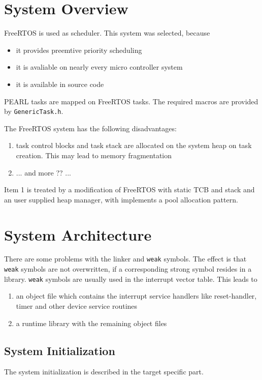 \section{System Overview}
FreeRTOS is used as scheduler. This system was selected, because
\begin{itemize}
\item it provides preemtive priority scheduling
\item it is avaliable on nearly every micro controller system
\item it is available in source code
\end{itemize}

PEARL tasks are mapped on FreeRTOS tasks. The required macros
are provided by \texttt{GenericTask.h}.

The FreeRTOS system has the following disadvantages:
\begin{enumerate}
\item task control blocks and task stack are allocated on the system
   heap on task creation. This may lead to memory fragmentation
\item ... and more ?? ... 
\end{enumerate}

Item 1 is treated by a modification of FreeRTOS with static TCB and stack
and an user supplied heap manager, with implements a pool allocation pattern.

\section{System Architecture}
There are some problems with the linker and \texttt{weak} symbols.
The effect is that \texttt{weak} symbols are not overwritten, if
a corresponding strong symbol resides in a library.
\texttt{weak} symbols are usually used in the interrupt vector table.
This leads to
\begin{enumerate}
\item an object file which contains the interrupt service handlers like
   reset-handler, timer and other device service routines
\item a runtime library with the remaining object files
\end{enumerate}

\subsection{System Initialization}
The system initialization is described in the target specific part.

